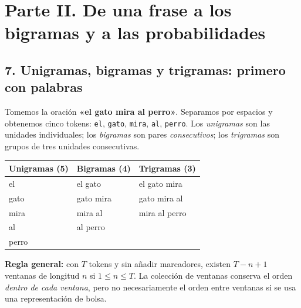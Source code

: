 \chapter*{Parte II. De una frase a los bigramas y a las probabilidades}
\section*{7. Unigramas, bigramas y trigramas: primero con palabras}
Tomemos la oración \textbf{«el gato mira al perro»}. Separamos por espacios y obtenemos cinco tokens: \texttt{el}, \texttt{gato}, \texttt{mira}, \texttt{al}, \texttt{perro}. Los \emph{unigramas} son las unidades individuales; los \emph{bigramas} son pares \emph{consecutivos}; los \emph{trigramas} son grupos de tres unidades consecutivas.
\begin{center}
\end{center}
\begin{center}
\begin{tabular}{lll}\toprule
Unigramas (5) & Bigramas (4) & Trigramas (3)\\\midrule
el & el gato & el gato mira\\
gato & gato mira & gato mira al\\
mira & mira al & mira al perro\\
al & al perro & \\
perro & & \\\bottomrule
\end{tabular}
\end{center}
\noindent\textbf{Regla general:} con $T$ tokens y sin añadir marcadores, existen $T-n+1$ ventanas de longitud $n$ si $1\le n\le T$. La colección de ventanas conserva el orden \emph{dentro de cada ventana}, pero no necesariamente el orden entre ventanas si se usa una representación de bolsa.

